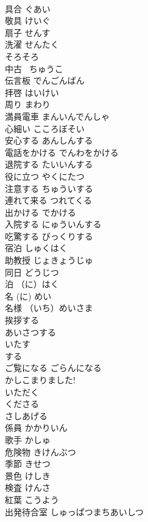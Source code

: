 \documentclass[8pt]{extreport}
\begin{document}
\begin{CJK}{UTF8}{min}
\\	具合	ぐあい	
\\	敬具	けいぐ	
\\	扇子	せんす	
\\	洗濯	せんたく	
\\	そろそろ		
\\	中古~	ちゅうこ~	
\\	伝言板	でんごんばん	
\\	拝啓	はいけい	
\\	周り	まわり	
\\	満員電車	まんいんでんしゃ	
\\	心細い	こころぼそい	
\\	安心する	あんしんする	
\\	電話をかける	でんわをかける	
\\	退院する	たいいんする	
\\	役に立つ	やくにたつ	
\\	注意する	ちゅういする	
\\	連れて来る	つれてくる	
\\	出かける	でかける	
\\	入院する	にゅういんする	
\\	吃驚する	びっくりする
\\	宿泊	しゅくはく	
\\	助教授	じょきょうじゅ	
\\	同日	どうじつ	
\\	泊	（に）はく	
\\	名	(に) めい	
\\	名様	（いち）めいさま	
\\	挨拶する
\\	あいさつする		
\\	いたす		
\\	する	
\\	ご覧になる	ごらんになる	
\\	かしこまりました!		
\\	いただく		
\\	くださる		
\\	さしあげる		
\\	係員	かかりいん	
\\	歌手	かしゅ	
\\	危険物	きけんぶつ	
\\	季節	きせつ	
\\	景色	けしき	
\\	検査	けんさ	
\\	紅葉	こうよう	
\\	出発待合室	しゅっぱつまちあいしつ	

\end{CJK}
\end{document}
